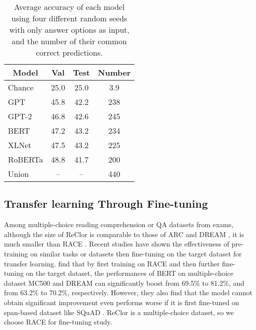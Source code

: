 \documentclass{article} \usepackage{iclr2020_conference,times}
\newcommand\bertbase{BERT\xspace}
\newcommand\xlnetbase{XLNet\xspace}
\newcommand\robertabase{RoBERTa\xspace}
\begin{document}
\begin{table}[ht]
	\small
	\caption{Average accuracy of each model using four different random seeds with only answer options as input, and the number of their common correct predictions.}
	\label{option-input}
	\begin{center}
		\begin{tabular}{lccc}
			\multicolumn{1}{c}{\bf Model}  &\multicolumn{1}{c}{\bf Val} &\multicolumn{1}{c}{\bf Test} &\multicolumn{1}{c}{\bf Number}
			\\ \hline 
			Chance & 25.0 & 25.0 & 3.9\\ 
			\hline
			GPT & 45.8 & 42.2 & 238 \\
			GPT-2 & 46.8 & 42.6 & 245\\
			\bertbase   &47.2 &43.2 & 234 \\
			\xlnetbase            &47.5 &43.2 & 225 \\
			\robertabase             &48.8 &41.7 & 200\\
			\hline
			Union & -- & -- & 440
		\end{tabular}
	\end{center}
\end{table}
\subsection{Transfer learning Through Fine-tuning}
Among multiple-choice reading comprehension or QA datasets from exams, although the size of ReClor is comparable to those of ARC \citep{clark2018think} and DREAM \citep{sun2019dream}, it is much smaller than RACE \cite{lai2017race}. Recent studies \citep{min2017question, howard2018universal, huang2019cosmos, jin2019mmm} have shown the effectiveness of pre-training on similar tasks or datasets then fine-tuning on the target dataset for transfer learning. \citet{jin2019mmm} find that by first training on RACE \citep{lai2017race} and then further fine-tuning on the target dataset, the performances of \bertbase on multiple-choice dataset MC500 \citep{richardson2013mctest} and DREAM \citep{sun2019dream} can significantly boost from 69.5\% to 81.2\%, and from 63.2\% to 70.2\%, respectively. However, they also find that the model cannot  obtain significant improvement even performs worse if it is first fine-tuned on span-based dataset like SQuAD \citep{rajpurkar2016squad}. ReClor is a multiple-choice dataset, so we choose RACE for fine-tuning study. 
\end{document}
